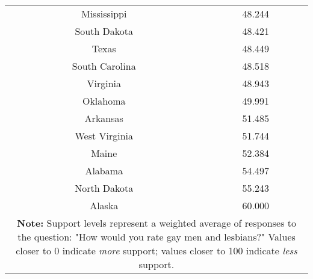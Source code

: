 \begin{longtable}{|c|c|}
Mississippi & 48.244\\
South Dakota & 48.421\\
Texas & 48.449\\
South Carolina & 48.518\\
Virginia & 48.943\\
Oklahoma & 49.991\\
Arkansas & 51.485\\
West Virginia & 51.744\\
Maine & 52.384\\
Alabama & 54.497\\
North Dakota & 55.243\\
Alaska & 60.000\\
\hline
\multicolumn{2}{p{0.8\linewidth}}{\small \textbf{Note:} Support levels represent a weighted average of responses to the question: "How would you rate gay men and lesbians?" Values closer to 0 indicate \textit{more} support; values closer to 100 indicate \textit{less} support.} \\ 
\end{longtable}
